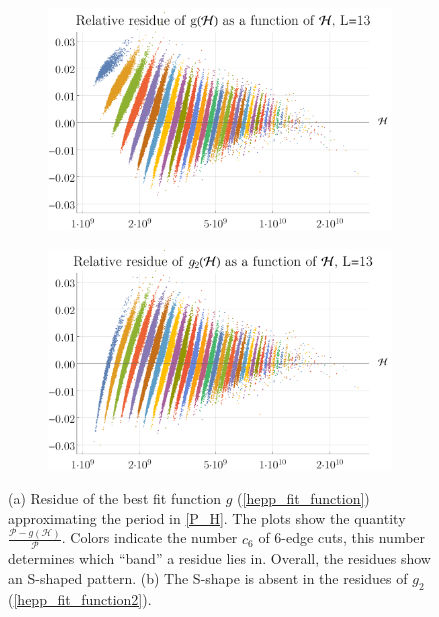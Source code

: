 \documentclass[12pt,a4paper]{article}
\newcommand{\period}{\mathcal P}
\renewcommand{\|}{\rule[-0.4ex]{0.2ex}{1.2em}}
\begin{document}
\begin{figure}[htbp]
	\begin{subfigure}[b]{.48 \textwidth}
		\includegraphics[width=\linewidth]{residue_g_13}
		\subcaption{}
		\label{fig:residue_g_13}
	\end{subfigure}
	\begin{subfigure}[b]{.48 \textwidth}
		\includegraphics[width=\linewidth]{residue_g2_13}
		\subcaption{}
		\label{fig:residue_g2_13}
	\end{subfigure}
	\caption{(a) Residue of the best fit function $g$  (\cref{hepp_fit_function}) approximating the period in  \cref{P_H}. The plots show the quantity $\frac{\period -g(\mathcal H)}{\period}$. Colors indicate the number $c_6$ of 6-edge cuts, this number determines which \enquote{band} a residue lies in. Overall, the residues show an S-shaped pattern. (b) The S-shape is absent in the residues of $g_2$ (\cref{hepp_fit_function2}).}
	\label{fig:residue_hepp}
\end{figure}
\end{document}
